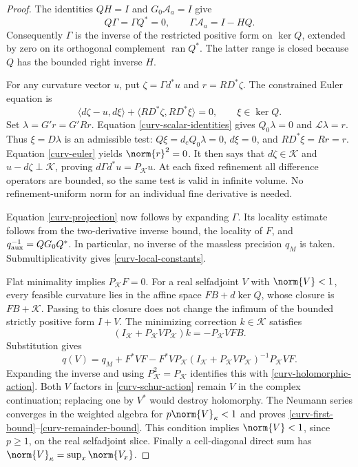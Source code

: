 \begin{proof}
The identities $QH=I$ and $G_0\mathcal A_a=I$ give
\begin{equation}\label{curv-constrained-inverse}
 Q\Gamma=\Gamma Q^*=0,\qquad
 \Gamma\mathcal A_a=I-HQ.
\end{equation}
Consequently $\Gamma$ is the inverse of the restricted positive
form on $\ker Q$, extended by zero on its orthogonal complement
$\operatorname{ran}Q^*$. The latter range is closed because $Q$
has the bounded right inverse $H$.

For any curvature vector $u$, put $\zeta=\Gamma d^*u$ and
$r=RD^*\zeta$. The constrained Euler equation is
\begin{equation}\label{curv-euler}
 \langle d\zeta-u,d\xi\rangle
    +\langle RD^*\zeta,RD^*\xi\rangle=0,
       \qquad \xi\in\ker Q.
\end{equation}
Set $\lambda=G'r=G'Rr$. Equation
\eqref{curv-scalar-identities} gives $Q_0\lambda=0$ and
$\mathcal L\lambda=r$. Thus $\xi=D\lambda$ is an admissible
test: $Q\xi=d_cQ_0\lambda=0$, $d\xi=0$, and
$RD^*\xi=Rr=r$. Equation \eqref{curv-euler} yields
$\norm{r}^2=0$. It then says that $d\zeta\in\mathcal K$ and
$u-d\zeta\perp\mathcal K$, proving
$d\Gamma d^*u=P_{\mathcal K}u$. At each fixed refinement all
difference operators are bounded, so the same test is valid in
infinite volume. No refinement-uniform norm for an individual
fine derivative is needed.

Equation \eqref{curv-projection} now follows by expanding $\Gamma$.
Its locality estimate follows from the two-derivative inverse bound,
the locality of $F$, and
$q_{\rm aux}^{-1}=QG_0Q^*$. In particular, no inverse of the
massless precision $q_M$ is taken. Submultiplicativity gives
\eqref{curv-local-constants}.

Flat minimality implies $P_{\mathcal K}F=0$. For a real
selfadjoint $V$ with $\norm{V}<1$, every feasible curvature lies
in the affine space $FB+d\ker Q$, whose closure is
$FB+\mathcal K$. Passing to this closure does not change the
infimum of the bounded strictly positive form $I+V$.
The minimizing correction $k\in\mathcal K$ satisfies
\[
 (I_{\mathcal K}+P_{\mathcal K}VP_{\mathcal K})k
       =-P_{\mathcal K}VFB.
\]
Substitution gives
\begin{equation}\label{curv-schur-action}
 q(V)=q_M+F^*VF-
 F^*VP_{\mathcal K}(I_{\mathcal K}
       +P_{\mathcal K}VP_{\mathcal K})^{-1}
       P_{\mathcal K}VF.
\end{equation}
Expanding the inverse and using $P_{\mathcal K}^2=P_{\mathcal K}$
identifies this with \eqref{curv-holomorphic-action}. Both $V$
factors in \eqref{curv-schur-action} remain $V$ in the complex
continuation; replacing one by $V^*$ would destroy holomorphy.
The Neumann series converges in the weighted algebra for
$p\norm{V}_\kappa<1$ and proves
\eqref{curv-first-bound}--\eqref{curv-remainder-bound}.
This condition implies $\norm{V}<1$, since $p\ge1$, on the real
selfadjoint slice. Finally a cell-diagonal direct sum has
$\norm{V}_\kappa=\sup_x\norm{V_x}$.
\end{proof}

